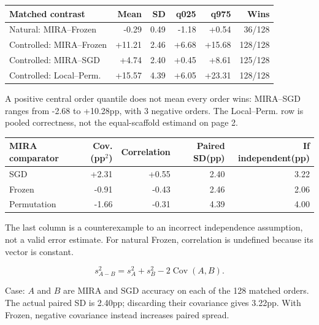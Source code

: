 \documentclass[10pt,letterpaper]{article}
\newcommand{\note}[1]{{\fontsize{8.5}{10.5}\selectfont #1\par}}
\newenvironment{clean}{\begin{center}\fontsize{9.5}{11.5}\selectfont\setlength{\tabcolsep}{6pt}\renewcommand{\arraystretch}{1.06}}{\end{center}}
\begin{document}
\par\noindent\begin{minipage}{\linewidth}\end{minipage}\par
\begin{clean}\begin{tabular}{@{}lrrrrr@{}}
\toprule
Matched contrast & Mean & SD & q025 & q975 & Wins \\
\midrule
Natural: MIRA--Frozen & -0.29 & 0.49 & -1.18 & +0.54 & 36/128 \\
Controlled: MIRA--Frozen & +11.21 & 2.46 & +6.68 & +15.68 & 128/128 \\
Controlled: MIRA--SGD & +4.74 & 2.40 & +0.45 & +8.61 & 125/128 \\
Controlled: Local--Perm. & +15.57 & 4.39 & +6.05 & +23.31 & 128/128 \\
\bottomrule\end{tabular}\end{clean}
\note{A positive central order quantile does not mean every order wins: MIRA--SGD ranges from -2.68 to +10.28pp, with 3 negative orders. The Local--Perm. row is pooled correctness, not the equal-scaffold estimand on page 2.}
\par\noindent\begin{minipage}{\linewidth}\end{minipage}\par
\begin{clean}\begin{tabular}{@{}lrrrr@{}}
\toprule
MIRA comparator & Cov.(pp$^2$) & Correlation & Paired SD(pp) & If independent(pp) \\
\midrule
SGD & +2.31 & +0.55 & 2.40 & 3.22 \\
Frozen & -0.91 & -0.43 & 2.46 & 2.06 \\
Permutation & -1.66 & -0.31 & 4.39 & 4.00 \\
\bottomrule\end{tabular}\end{clean}
\note{The last column is a counterexample to an incorrect independence assumption, not a valid error estimate. For natural Frozen, correlation is undefined because its vector is constant.}
$$s_{A-B}^{2}=s_A^{2}+s_B^{2}-2\operatorname{Cov}(A,B).$$
\note{Case: $A$ and $B$ are MIRA and SGD accuracy on each of the 128 matched orders.
The actual paired SD is 2.40pp; discarding their covariance gives 3.22pp.
With Frozen, negative covariance instead increases paired spread.}
\end{document}
